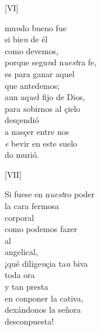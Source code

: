 \documentclass[11pt,a4paper,twoside]{article}
\newcommand{\comillas}[1]{«#1»}
\begin{document}
{\begin{center}
	[VI]\footnoteA{[VI] \comillas{p\textit{r}osigue} \textit{LB3}.}
\end{center}
\pstart
{} mu\textit{n}do bueno fue\\
si bie\textit{n}  de él\\
como devemos,\\
porque segu\textit{n}d n\textit{uest}ra fe,\\
es para ganar aquel\\
que antedemos;\\
 aun aq\textit{ue}l fijo de Dios,\\
para sobirnos al çielo\\
desçendió\\
a nasçer  entre nos\\
\textit{e} bevir en este suelo\\
do murió.
\pend

\begin{center}
	[VII]
\end{center}
\pstart
Si fuese en n\textit{uest}ro poder\\
 la cara fermosa\\
corporal\\
como podemos fazer\\
al  \\
angelical,\\
¡qué dilige\textit{n}çia ta\textit{n} biva\\
 toda ora\\
y tan presta\\
en conponer la cativa,\\
dexándonos la señora\\
desconpuesta!
\pend

}
\end{document}
